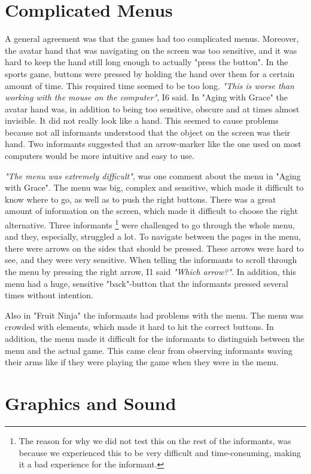\section{Complicated Menus}
A general agreement was that the games had too complicated menus. Moreover, the avatar hand that was navigating on the screen was too sensitive, and it was hard to keep the hand still long enough to actually "press the button". In the sports game, buttons were pressed by holding the hand over them for a certain amount of time. This required time seemed to be too long. \emph{"This is worse than working with the mouse on the computer"}, I6 said. In "Aging with Grace" the avatar hand was, in addition to being too sensitive, obscure and at times almost invisible. It did not really look like a hand. This seemed to cause problems because not all informants understood that the object on the screen was their hand. Two informants suggested that an arrow-marker like the one used on most computers would be more intuitive and easy to use. 

\emph{"The menu was extremely difficult"}, was one comment about the menu in "Aging with Grace". The menu was big, complex and sensitive, which made it difficult to know where to go, as well as to push the right buttons. There was a great amount of information on the screen, which made it difficult to choose the right alternative. Three informants \footnote{The reason for why we did not test this on the rest of the informants, was because we experienced this to be very difficult and time-consuming, making it a bad experience for the informant.} were challenged to go through the whole menu, and they, especially, struggled a lot. To navigate between the pages in the menu, there were arrows on the sides that should be pressed. These arrows were hard to see, and they were very sensitive. When telling the informants to scroll through the menu by pressing the right arrow, I1 said \emph{"Which arrow?"}. In addition, this menu had a huge, sensitive "back"-button that the informants pressed several times without intention. 

Also in "Fruit Ninja" the informants had problems with the menu. The menu was crowded with elements, which made it hard to hit the correct buttons. In addition, the menu made it difficult for the informants to distinguish between the menu and the actual game. This came clear from observing informants waving their arms like if they were playing the game when they were in the menu. 

\section{Graphics and Sound}

